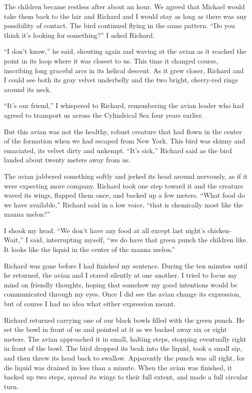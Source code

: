 \documentclass[]{article}
\begin{document}
The children became restless after about an hour. We agreed that Michael would take them back to the lair and Richard and I would stay as long as there was any possibility of contact. The bird continued flying in the same pattern. “Do you think it’s looking for something?” I asked Richard.

“I don’t know,” he said, shouting again and waving at the avian as it reached the point in its loop where it was closest to us. This time it changed course, inscribing long graceful arcs in its helical descent. As it grew closer, Richard and I could see both its gray velvet underbelly and the two bright, cherry-red rings around its neck.

“It’s our friend,” I whispered to Richard, remembering the avian leader who had agreed to transport us across the Cylindrical Sea four years earlier.

But this avian was not the healthy, robust creature that had flown in the center of the formation when we had escaped from New York. This bird was skinny and emaciated, its velvet dirty and unkempt. “It’s sick,” Richard said as the bird landed about twenty meters away from us.

The avian jabbered something softly and jerked its head around nervously, as if it were expecting more company. Richard took one step toward it and the creature waved its wings, flapped them once, and backed up a few meters. “What food do we have available,” Richard said in a low voice, “that is chemically most like the manna melon?”

I shook my head. “We don’t have any food at all except last night’s chicken-Wait,” I said, interrupting myself, “we do have that green punch the children like. It looks like the liquid in the center of the manna melon.”

Richard was gone before I had finished my sentence. During the ten minutes until he returned, the avian and I stared silently at one another. I tried to focus my mind on friendly thoughts, hoping that somehow my good intentions would be communicated through my eyes. Once I did see the avian change its expression, but of course I had no idea what either expression meant.

Richard returned carrying one of our black bowls filled with the green punch. He set the bowl in front of us and pointed at it as we backed away six or eight meters. The avian approached it in small, halting steps, stopping eventually right in front of the bowl. The bird dropped its beak into the liquid, took a small sip, and then threw its head back to swallow. Apparently the punch was all right, for die liquid was drained in less than a minute. When the avian was finished, it backed up two steps, spread its wings to their full extent, and made a full circular turn.
\end{document}
